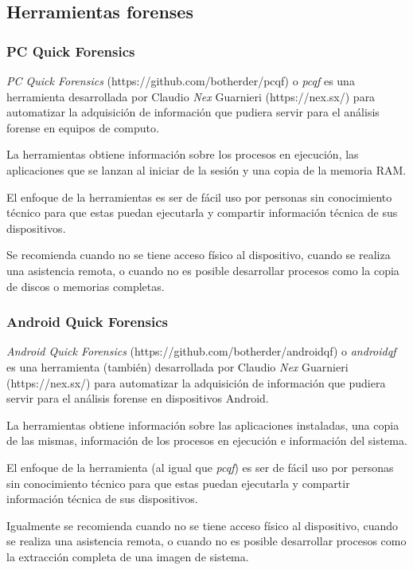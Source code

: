 \documentclass[12pt]{caltech_thesis}
\begin{document}
\subsection{Herramientas forenses}

\subsubsection{PC Quick Forensics}

\textit{PC Quick Forensics} (https://github.com/botherder/pcqf) o \textit{pcqf} es una herramienta desarrollada por Claudio \textit{Nex} Guarnieri (https://nex.sx/) para automatizar la adquisición de información que pudiera servir para el análisis forense en equipos de computo.

La herramientas obtiene información sobre los procesos en ejecución, las aplicaciones que se lanzan al iniciar de la sesión y una copia de la memoria RAM. 

El enfoque de la herramientas es ser de fácil uso por personas sin conocimiento técnico para que estas puedan ejecutarla y compartir información técnica de sus dispositivos.

Se recomienda cuando no se tiene acceso físico al dispositivo, cuando se realiza una asistencia remota, o cuando no es posible desarrollar procesos como la copia de discos o memorias completas.

\subsubsection{Android Quick Forensics}

\textit{Android Quick Forensics} (https://github.com/botherder/androidqf) o \textit{androidqf} es una herramienta (también) desarrollada por Claudio \textit{Nex} Guarnieri (https://nex.sx/) para automatizar la adquisición de información que pudiera servir para el análisis forense en dispositivos Android.

La herramientas obtiene información sobre las aplicaciones instaladas, una copia de las mismas, información de los procesos en ejecución e información del sistema.

El enfoque de la herramienta (al igual que \textit{pcqf}) es ser de fácil uso por personas sin conocimiento técnico para que estas puedan ejecutarla y compartir información técnica de sus dispositivos.

Igualmente se recomienda cuando no se tiene acceso físico al dispositivo, cuando se realiza una asistencia remota, o cuando no es posible desarrollar procesos como la extracción completa de una imagen de sistema.
\end{document}
